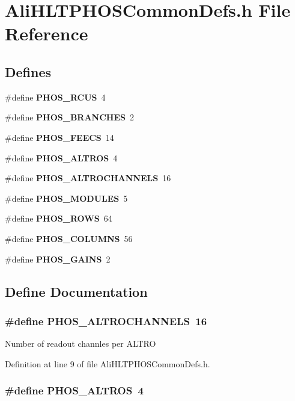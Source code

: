 \section{Ali\-HLTPHOSCommon\-Defs.h File Reference}
\label{AliHLTPHOSCommonDefs_8h}


\subsection*{Defines}
\begin{CompactItemize}
\item 
\#define {\bf PHOS\_\-RCUS}\ 4
\item 
\#define {\bf PHOS\_\-BRANCHES}\ 2
\item 
\#define {\bf PHOS\_\-FEECS}\ 14
\item 
\#define {\bf PHOS\_\-ALTROS}\ 4
\item 
\#define {\bf PHOS\_\-ALTROCHANNELS}\ 16
\item 
\#define {\bf PHOS\_\-MODULES}\ 5
\item 
\#define {\bf PHOS\_\-ROWS}\ 64
\item 
\#define {\bf PHOS\_\-COLUMNS}\ 56
\item 
\#define {\bf PHOS\_\-GAINS}\ 2
\end{CompactItemize}


\subsection{Define Documentation}
\subsubsection{\setlength{\rightskip}{0pt plus 5cm}\#define PHOS\_\-ALTROCHANNELS\ 16}\label{AliHLTPHOSCommonDefs_8h_a4}


Number of readout channles per ALTRO 

Definition at line 9 of file Ali\-HLTPHOSCommon\-Defs.h.
\subsubsection{\setlength{\rightskip}{0pt plus 5cm}\#define PHOS\_\-ALTROS\ 4}\label{AliHLTPHOSCommonDefs_8h_a3}


